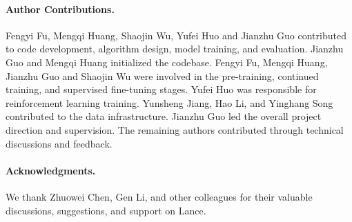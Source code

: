 






\paragraph{Author Contributions.}
Fengyi Fu, Mengqi Huang, Shaojin Wu, Yufei Huo and Jianzhu Guo contributed to code development, algorithm design, model training, and evaluation.
Jianzhu Guo and Mengqi Huang initialized the codebase.
Fengyi Fu, Mengqi Huang, Jianzhu Guo and Shaojin Wu were involved in the pre-training, continued training, and supervised fine-tuning stages.
Yufei Huo was responsible for reinforcement learning training.
Yunsheng Jiang, Hao Li, and Yinghang Song contributed to the data infrastructure.
Jianzhu Guo led the overall project direction and supervision.
The remaining authors contributed through technical discussions and feedback.

\paragraph{Acknowledgments.}
We thank Zhuowei Chen, Gen Li, and other colleagues for their valuable discussions, suggestions, and support on Lance.

